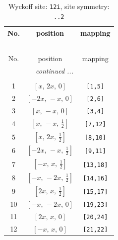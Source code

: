\documentclass[fleqn,8pt]{jsarticle}
\begin{document}
\begin{longtable}{ccc}
\caption{Wyckoff site: {\tt 12i}, site symmetry: {\tt ..2}}
 \\
 \hline \hline
No. & position & mapping \\ \hline \endfirsthead

\multicolumn{2}{l}{\tablename\ \thetable{}} \\
 \hline \hline
No. & position & mapping \\ \hline \endhead

 \hline \hline
\multicolumn{2}{r}{\footnotesize\it continued ...} \\ \endfoot

 \hline \hline
\multicolumn{2}{r}{} \\ \endlastfoot

1 & $\left[ x,\, 2 x,\, 0 \right]$ & {\tt [1,5]} \\ \hline
2 & $\left[ - 2 x,\, - x,\, 0 \right]$ & {\tt [2,6]} \\ \hline
3 & $\left[ x,\, - x,\, 0 \right]$ & {\tt [3,4]} \\ \hline
4 & $\left[ x,\, - x,\, \frac{1}{2} \right]$ & {\tt [7,12]} \\ \hline
5 & $\left[ x,\, 2 x,\, \frac{1}{2} \right]$ & {\tt [8,10]} \\ \hline
6 & $\left[ - 2 x,\, - x,\, \frac{1}{2} \right]$ & {\tt [9,11]} \\ \hline
7 & $\left[ - x,\, x,\, \frac{1}{2} \right]$ & {\tt [13,18]} \\ \hline
8 & $\left[ - x,\, - 2 x,\, \frac{1}{2} \right]$ & {\tt [14,16]} \\ \hline
9 & $\left[ 2 x,\, x,\, \frac{1}{2} \right]$ & {\tt [15,17]} \\ \hline
10 & $\left[ - x,\, - 2 x,\, 0 \right]$ & {\tt [19,23]} \\ \hline
11 & $\left[ 2 x,\, x,\, 0 \right]$ & {\tt [20,24]} \\ \hline
12 & $\left[ - x,\, x,\, 0 \right]$ & {\tt [21,22]} \\
\end{longtable}
\renewcommand{\arraystretch}{1.2}
\end{document}
